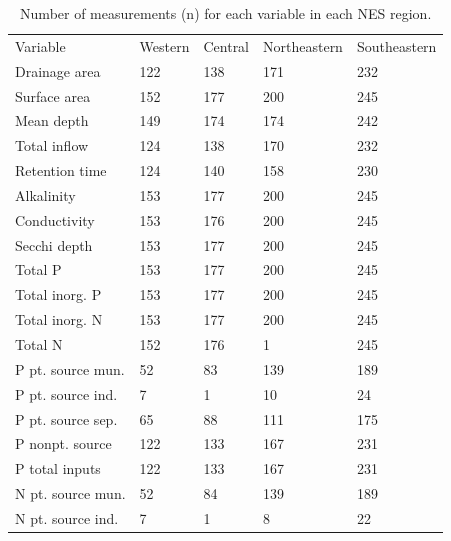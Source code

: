 \documentclass[journal abbreviations, manuscript]{copernicus}
\begin{document}
\begin{table}
\caption{Number of measurements (n) for each variable in each NES region.}\label{table:n}
\begin{tabular}{lllll}
\tophline
Variable & Western & Central & Northeastern & Southeastern\\
\middlehline
Drainage area & 122 & 138 & 171 & 232\\

Surface area & 152 & 177 & 200 & 245\\

Mean depth & 149 & 174 & 174 & 242\\

Total inflow & 124 & 138 & 170 & 232\\

Retention time & 124 & 140 & 158 & 230\\

Alkalinity & 153 & 177 & 200 & 245\\

Conductivity & 153 & 176 & 200 & 245\\

Secchi depth & 153 & 177 & 200 & 245\\

Total P & 153 & 177 & 200 & 245\\

Total inorg. P & 153 & 177 & 200 & 245\\

Total inorg. N & 153 & 177 & 200 & 245\\

Total N & 152 & 176 & 1 & 245\\

P pt. source mun. & 52 & 83 & 139 & 189\\

P pt. source ind. & 7 & 1 & 10 & 24\\

P pt. source sep. & 65 & 88 & 111 & 175\\

P nonpt. source & 122 & 133 & 167 & 231\\

P total inputs & 122 & 133 & 167 & 231\\

N pt. source mun. & 52 & 84 & 139 & 189\\

N pt. source ind. & 7 & 1 & 8 & 22\\


\end{tabular}
\end{table}
\end{document}
